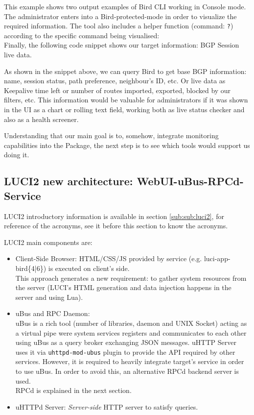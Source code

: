 This example shows two output examples of Bird CLI working in Console mode. The administrator enters into a Bird-protected-mode in order to visualize the required information. The tool also includes a helper function (command: \texttt{?}) according to the specific command being visualised:\\



Finally, the following code snippet shows our target information: BGP Session live data.



As shown in the snippet above, we can query Bird to get base BGP information: name, session status, path preference, neighbour's ID, etc. Or live data as Keepalive time left or number of routes imported, exported, blocked by our filters, etc. This information would be valuable for administrators if it was shown in the UI as a chart or rolling text field, working both as live status checker and also as a health screener.

Understanding that our main goal is to, somehow, integrate monitoring capabilities into the Package, the next step is to see which tools would support us doing it.

\subsection{LUCI2 new architecture: WebUI-uBus-RPCd-Service}
LUCI2 introductory information is available in section \ref{sub:sub:luci2}, for reference of the acronyms, see it before this section to know the acronyms.

LUCI2 main components are: 

\begin{itemize}
    \item Client-Side Browser: HTML/CSS/JS provided by service (e.g. luci-app-bird\{4|6\}) is executed on client's side.\\
    This approach generates a new requirement: to gather system resources from the server (LUCI's HTML generation and data injection happens in the server and using Lua).
    \item uBus and RPC Daemon:\\
    uBus is a rich tool (number of libraries, daemon and UNIX Socket) acting as a virtual pipe were system services registers and communicates to each other using uBus as a query broker exchanging JSON messages. uHTTP Server uses it via \texttt{uhttpd-mod-ubus} plugin to provide the API required by other services. However, it is required to heavily integrate target's service in order to use uBus. In order to avoid this, an alternative RPCd backend server is used.\\ RPCd is explained in the next section.
    \item uHTTPd Server: \textit{Server-side} HTTP server to satisfy queries.
\end{itemize}

